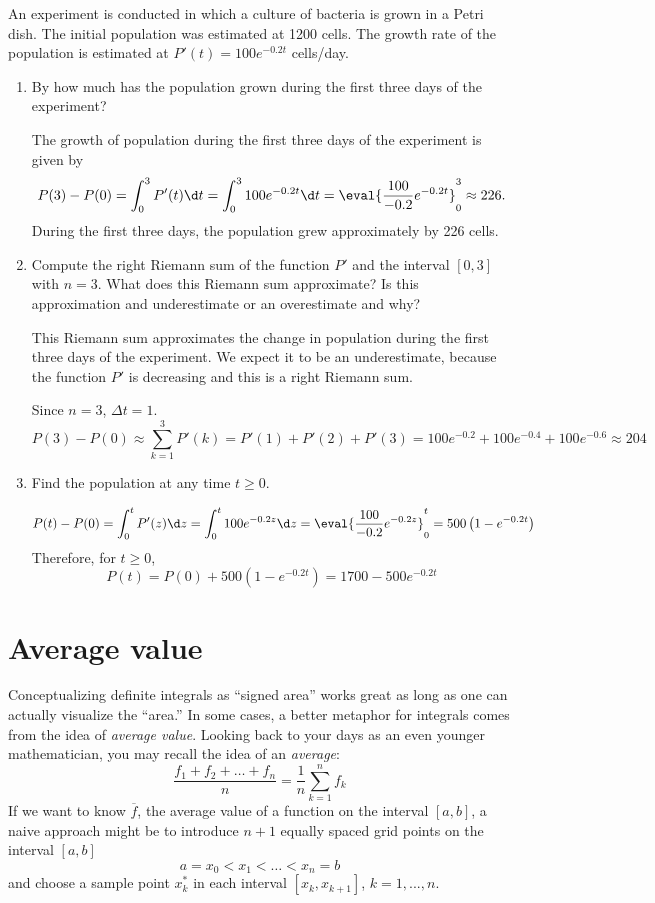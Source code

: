 \documentclass{ximera}
\begin{document}
\begin{example}
An experiment is conducted in which a culture of bacteria is grown in a Petri dish. The initial population was  estimated at 1200 cells. 
The  growth rate of the population is estimated at  $P'(t)=100e^{-0.2 t}$ cells/day.
\begin{enumerate}
\item By how much has the population grown during the first three days of the experiment?
\begin{explanation}
The growth of population during the first three days of the experiment is given by
\[
P(3)-P(0)=\int_0^3 P'(t)\d t=\int_0^3 100 e^{-0.2 t}\d t=\eval{\frac{100}{-0.2}e^{-0.2 t}}_0^3\approx 226.
\]
During the first three  days, the population  grew  approximately by 226 cells. 
\end{explanation}

\item 
Compute the right Riemann sum of the function $P'$ and the interval $[0,3]$ with $n=3$.
What does this Riemann sum approximate?  Is this approximation and underestimate or an overestimate and why?


\begin{explanation}
This Riemann sum approximates the change in population during the first three days of the experiment.
We expect it to be an underestimate, because the function $P'$ is decreasing and this is a right Riemann sum.

Since $n=3$,  $\Delta t=1$.
\[
P(3)-P(0)\approx\sum_{k=1}^3P'(k)=P'(1)+P'(2)+P'(3)=100e^{-0.2 }+100e^{-0.4}+100e^{-0.6}\approx 204
\]
\end{explanation}
\item Find the population at any time $t\ge0$.
\begin{explanation}
\[
P(t)-P(0)=\int_0^t P'(z)\d z=\int_0^t 100 e^{-0.2 z}\d z=\eval{\frac{100}{-0.2}e^{-0.2 z}}_0^t=500\left(1-e^{-0.2 t}\right)
\]
Therefore, for $t\ge0$,
\[
P(t)=P(0)+500\left(1-e^{-0.2 t}\right)=1700 -500e^{-0.2 t}
\]
\end{explanation}
\end{enumerate}
\end{example}

\section{Average value}

Conceptualizing definite integrals as ``signed area'' works great as
long as one can actually visualize the ``area.'' In some cases, a
better metaphor for integrals comes from the idea of \textit{average
  value}.  Looking back to your days as an even younger mathematician,
you may recall the idea of an \textit{average}:
\[
\frac{f_1+f_2+\dots+f_n}{n} = \frac{1}{n}\sum_{k=1}^n f_k
\]
If we want to know $\overline{f}$, the average value of a function on the interval $[a,b]$, a naive approach
might be to introduce $n+1$ equally spaced
grid points on the interval $[a,b]$
\[
a=x_0 < x_1 < \dots < x_{n}=b
\]
and choose a sample point $x_k^*$ in  each interval $[x_k,x_{k+1}]$, $k=1,...,n$. 
\end{document}
